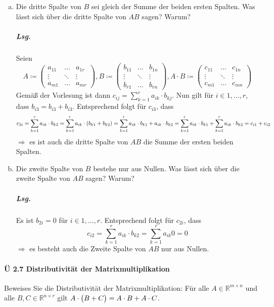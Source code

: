 \documentclass{scrreprt}
\begin{document}
\begin{enumerate}[(a)]
\item Die dritte Spalte von $B$ sei gleich der Summe der beiden ersten Spalten.
  Was lässt sich über die dritte Spalte von $AB$ sagen?
  Warum?

  \subparagraph{Lsg.} Seien
  \[
    A \coloneqq \begin{pmatrix}
      a_{11} & \ldots & a_{1r} \\
      \vdots & \ddots & \vdots \\
      a_{m1} & \ldots & a_{mr}
    \end{pmatrix},
    B \coloneqq \begin{pmatrix}
      b_{11} & \ldots & b_{1n} \\
      \vdots & \ddots & \vdots \\
      b_{r1} & \ldots & b_{rn}
    \end{pmatrix},
    A \cdot B \coloneqq \begin{pmatrix}
      c_{11} & \ldots & c_{1n} \\
      \vdots & \ddots & \vdots \\
      c_{m1} & \ldots & c_{mn}
    \end{pmatrix}
  \]
  Gemäß der Vorlesung ist dann
  $c_{ij} = \sum_{k = 1}^r a_{ik} \cdot b_{kj}$.
  Nun gilt für $i \in 1, \ldots, r$, dass $b_{i3} = b_{i3} + b_{i3}$.
  Entsprechend folgt für $c_{i3}$, dass
  \[
    c_{3i} = \sum_{k = 1}^r a_{ik} \cdot b_{k3} =
    \sum_{k = 1}^r a_{ik} \cdot \qty(b_{k1} + b_{k2}) =
    \sum_{k = 1}^r a_{ik} \cdot b_{k1} + a_{ik} \cdot b_{k2} =
    \sum_{k = 1}^r a_{ik} \cdot b_{k1} + \sum_{k = 1}^r a_{ik} \cdot b_{k2} =
    c_{i1} + c_{i2}
  \]
  $\Rightarrow$ es ist auch die dritte Spalte von $AB$ die Summe der ersten
  beiden Spalten.

\item Die zweite Spalte von $B$ bestehe nur aus Nullen.
  Was lässt sich über die zweite Spalte von $AB$ sagen?
  Warum?

  \subparagraph{Lsg.} Es ist $b_{2i} = 0$ für $i \in 1, \ldots, r$.
  Entsprechend folgt für $c_{2i}$, dass
  \[
    c_{i2} = \sum_{k = 1}^r a_{ik} \cdot b_{k2} =
    \sum_{k = 1}^r a_{ik} 0 = 0
  \]
  $\Rightarrow$ es besteht auch die Zweite Spalte von $AB$ nur aus Nullen.
\end{enumerate}

\newpage
\paragraph{Ü 2.7 Distributivität der Matrixmultiplikation}
Beweises Sie die Distributivität der Matrixmultiplikation:
Für alle $A \in \mathbb{R}^{m \times n}$ und alle
$B, C \in \mathbb{R}^{n \times r}$ gilt
$A \cdot \qty\big(B + C) = A \cdot B + A \cdot C$.
\end{document}
